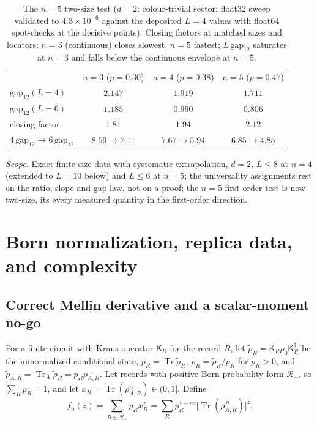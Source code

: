 \documentclass[aps,prx,reprint,superscriptaddress,nobibnotes,longbibliography]{revtex4-2}
\theoremstyle{remark}
\newcommand{\Tr}{\operatorname{Tr}}
\begin{document}
\begin{table}[t]
\caption{The $n=5$ two-size test ($d=2$; colour-trivial sector; float32
sweep validated to $4.3\times10^{-6}$ against the deposited $L=4$ values
with float64 spot-checks at the decisive points).  Closing factors at
matched sizes and locators: $n=3$ (continuous) closes slowest, $n=5$
fastest; $L\,\mathrm{gap}_{12}$ saturates at $n=3$ and falls below the
continuous envelope at $n=5$.}
\label{tab:n5twosize}
\begin{ruledtabular}
\begin{tabular}{lccc}
 & $n=3$ ($p=0.30$) & $n=4$ ($p=0.38$) & $n=5$ ($p=0.47$) \\
\colrule
$\mathrm{gap}_{12}(L{=}4)$ & $2.147$ & $1.919$ & $1.711$ \\
$\mathrm{gap}_{12}(L{=}6)$ & $1.185$ & $0.990$ & $0.806$ \\
closing factor & $1.81$ & $1.94$ & $2.12$ \\
$4\,\mathrm{gap}_{12}\to6\,\mathrm{gap}_{12}$ &
$8.59\to7.11$ & $7.67\to5.94$ & $6.85\to4.85$ \\
\end{tabular}
\end{ruledtabular}
\end{table}

\emph{Scope.}  Exact finite-size data with systematic extrapolation,
$d=2$, $L\le8$ at $n=4$ (extended to $L=10$ below) and $L\le6$ at
$n=5$; the universality assignments rest on the ratio, slope and gap law,
not on a proof; the $n=5$ first-order test is now two-size, its every
measured quantity in the first-order direction.

\section{Born normalization, replica data, and complexity}

\subsection{Correct Mellin derivative and a scalar-moment no-go}

For a finite circuit with Kraus operator $\mathsf K_R$ for the record $R$, let $\tilde\rho_R=\mathsf K_R\rho_0\mathsf K_R^\dagger$ be the unnormalized conditional state, $p_R=\Tr\tilde\rho_R$, $\rho_R=\tilde\rho_R/p_R$ for $p_R>0$, and $\tilde\rho_{A,R}=\Tr_{\bar A}\tilde\rho_R=p_R\rho_{A,R}$.  Let records with positive Born probability form $\mathcal R_+$, so $\sum_Rp_R=1$, and let
$x_R=\Tr(\rho_{A,R}^n)\in(0,1]$.  Define
\begin{equation}
 f_n(z)=\sum_{R\in\mathcal R_+}p_Rx_R^z
 =\sum_Rp_R^{1-nz}\bigl[\Tr(\tilde\rho_{A,R}^{\,n})\bigr]^z.
 \label{eq:Mellin}
\end{equation}
\end{document}
